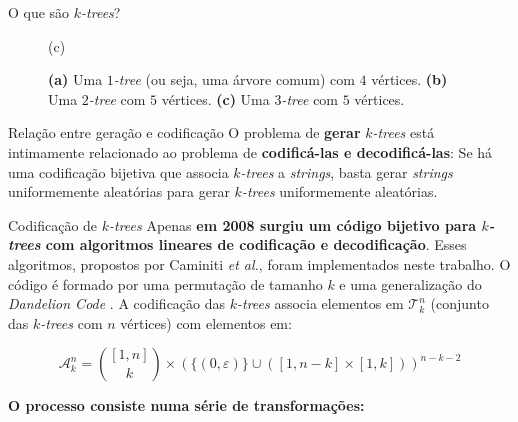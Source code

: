 \documentclass{beamer}
\begin{document}
\begin{frame}
\begin{columns}[t]
\begin{column}{.5\textwidth}
\begin{block}{O que são \emph{$k$-trees}?}
\begin{figure}
\begin{minipage}{0.3333\textwidth}
{
        }

        (c)
      \end{minipage}

      \caption{
        \textbf{(a)} Uma \emph{$1$-tree} (ou seja, uma árvore comum) com $4$ vértices.
        \textbf{(b)} Uma \emph{$2$-tree} com $5$ vértices.
        \textbf{(c)} Uma \emph{$3$-tree} com $5$ vértices.
      }
      \label{fig:ktree}
    \end{figure}
  \end{block}

  \begin{block}{Relação entre geração e codificação}
    O problema de \textbf{gerar} \emph{$k$-trees} está intimamente relacionado ao problema de \textbf{codificá-las e decodificá-las}: Se há uma codificação bijetiva que associa \emph{$k$-trees} a \emph{strings}, basta gerar \emph{strings} uniformemente aleatórias para gerar \emph{$k$-trees} uniformemente aleatórias.
  \end{block}

  \begin{block}{Codificação de \emph{$k$-trees}}
    Apenas \textbf{em 2008 surgiu um código bijetivo para \emph{$k$-trees} com algoritmos lineares de codificação e decodificação}. Esses algoritmos, propostos por Caminiti \emph{et al.}, foram implementados neste trabalho. O código é formado por uma permutação de tamanho $k$ e uma generalização do \emph{Dandelion Code} \cite{egecioglu}. A codificação das \emph{$k$-trees} associa elementos em $\mathcal{T}^n_k$ (conjunto das \emph{$k$-trees} com $n$ vértices) com elementos em:

    $$
    \mathcal{A}^n_k = { [1,n] \choose k } \times (\{ ( 0, \varepsilon ) \} \cup ([1,n-k] \times [1,k]))^{n-k-2}
    $$

    \textbf{O processo consiste numa série de transformações:}

    \begin{figure}
      \begin{minipage}{0.5\textwidth}
        \centering
\end{minipage}
\end{figure}
\end{block}
\end{column}
\end{columns}
\end{frame}
\end{document}
